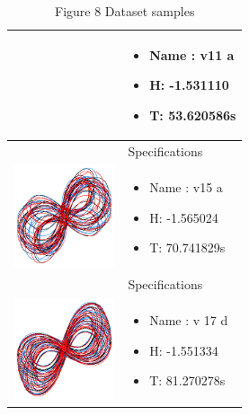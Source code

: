 \begin{table}[H]
\begin{tabular}{ | c | m{5cm}| }
\begin{minipage}{.3\textwidth}
		\end{minipage}
		&
		\begin{itemize}
			\item Name : v11 a
			\item H: -1.531110
			\item T: 53.620586s
		\end{itemize}\\
		\hline
		& Specifications\\ 
		\begin{minipage}{.3\textwidth}
			\includegraphics[width=30mm, height=30mm]{chapters/chapter5/v15a}
		\end{minipage}
		&
		\begin{itemize}
			\item Name : v15 a
			\item H: -1.565024
			\item T: 70.741829s
		\end{itemize}\\
		\hline
		& Specifications\\ 
		\begin{minipage}{.3\textwidth}
			\includegraphics[width=30mm, height=30mm]{chapters/chapter5/v17d}
		\end{minipage}
		&
		\begin{itemize}
			\item Name : v 17 d
			\item H: -1.551334
			\item T: 81.270278s
		\end{itemize}\\
		\hline
	\end{tabular}
	\caption{Figure 8 Dataset samples\cite{web}}\label{diverse}
\end{table}

